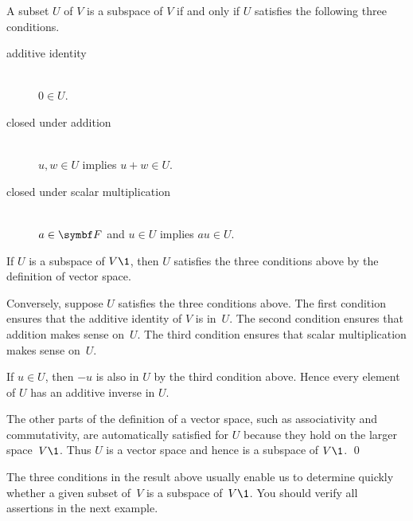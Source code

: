 \vspace{6bp}

{A subset $U$ of $V$ is a subspace of $V$ if and only if $U$  satisfies the following three conditions.
\begin{description}

\item[additive identity] \ \\
$0 \in U$.

\item[closed under addition]  \ \\
$u, w \in U$ implies $u + w \in U$.

\item[closed under scalar multiplication] \ \\
$a \in \F{}$ and $u \in U$ implies $au \in U$.
\end{description}}


\proof
If $U$ is a subspace of $V\1$, then $U$ satisfies the three conditions above by the definition of vector space.

Conversely, suppose $U$ satisfies the three conditions above. The first condition ensures that the additive identity of $V$ is in~$U$. The second condition ensures that addition makes
sense on~$U$. The third condition ensures that scalar multiplication makes sense
on~$U$.

If $u \in U$, then $-u$  is also in $U$ by the third condition above. Hence
every element of $U$ has an additive inverse in $U$.

The other parts of the definition of a vector space, such as associativity and commutativity, are
automatically satisfied for $U$ because they hold on the
larger space~$V\1$. Thus $U$ is a vector space and hence is a subspace of $V\1$.
\qed

\pagebreak[3]

The three conditions in the result above usually enable us to determine quickly whether a
given subset of~$V$ is a subspace of~$V\1$. You should verify all assertions in the next example.

